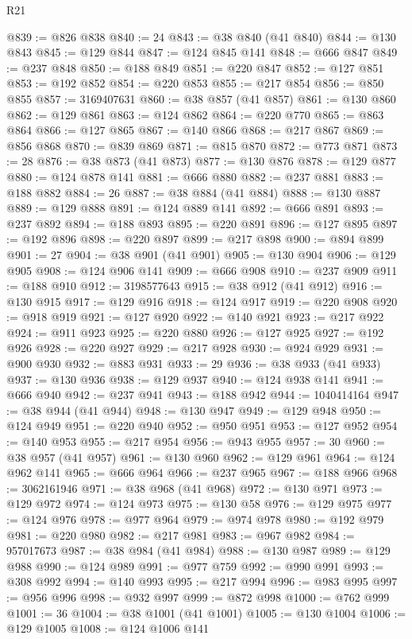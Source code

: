 \begin{lexlean}{R21}
\begin{coremodule}
@839 := @826 @838
@840 := 24
@843 := @38 @840 (@41 @840)
@844 := @130 @843
@845 := @129 @844
@847 := @124 @845 @141
@848 := @666 @847
@849 := @237 @848
@850 := @188 @849
@851 := @220 @847
@852 := @127 @851
@853 := @192 @852
@854 := @220 @853
@855 := @217 @854
@856 := @850 @855
@857 := 3169407631
@860 := @38 @857 (@41 @857)
@861 := @130 @860
@862 := @129 @861
@863 := @124 @862
@864 := @220 @770
@865 := @863 @864
@866 := @127 @865
@867 := @140 @866
@868 := @217 @867
@869 := @856 @868
@870 := @839 @869
@871 := @815 @870
@872 := @773 @871
@873 := 28
@876 := @38 @873 (@41 @873)
@877 := @130 @876
@878 := @129 @877
@880 := @124 @878 @141
@881 := @666 @880
@882 := @237 @881
@883 := @188 @882
@884 := 26
@887 := @38 @884 (@41 @884)
@888 := @130 @887
@889 := @129 @888
@891 := @124 @889 @141
@892 := @666 @891
@893 := @237 @892
@894 := @188 @893
@895 := @220 @891
@896 := @127 @895
@897 := @192 @896
@898 := @220 @897
@899 := @217 @898
@900 := @894 @899
@901 := 27
@904 := @38 @901 (@41 @901)
@905 := @130 @904
@906 := @129 @905
@908 := @124 @906 @141
@909 := @666 @908
@910 := @237 @909
@911 := @188 @910
@912 := 3198577643
@915 := @38 @912 (@41 @912)
@916 := @130 @915
@917 := @129 @916
@918 := @124 @917
@919 := @220 @908
@920 := @918 @919
@921 := @127 @920
@922 := @140 @921
@923 := @217 @922
@924 := @911 @923
@925 := @220 @880
@926 := @127 @925
@927 := @192 @926
@928 := @220 @927
@929 := @217 @928
@930 := @924 @929
@931 := @900 @930
@932 := @883 @931
@933 := 29
@936 := @38 @933 (@41 @933)
@937 := @130 @936
@938 := @129 @937
@940 := @124 @938 @141
@941 := @666 @940
@942 := @237 @941
@943 := @188 @942
@944 := 1040414164
@947 := @38 @944 (@41 @944)
@948 := @130 @947
@949 := @129 @948
@950 := @124 @949
@951 := @220 @940
@952 := @950 @951
@953 := @127 @952
@954 := @140 @953
@955 := @217 @954
@956 := @943 @955
@957 := 30
@960 := @38 @957 (@41 @957)
@961 := @130 @960
@962 := @129 @961
@964 := @124 @962 @141
@965 := @666 @964
@966 := @237 @965
@967 := @188 @966
@968 := 3062161946
@971 := @38 @968 (@41 @968)
@972 := @130 @971
@973 := @129 @972
@974 := @124 @973
@975 := @130 @58
@976 := @129 @975
@977 := @124 @976
@978 := @977 @964
@979 := @974 @978
@980 := @192 @979
@981 := @220 @980
@982 := @217 @981
@983 := @967 @982
@984 := 957017673
@987 := @38 @984 (@41 @984)
@988 := @130 @987
@989 := @129 @988
@990 := @124 @989
@991 := @977 @759
@992 := @990 @991
@993 := @308 @992
@994 := @140 @993
@995 := @217 @994
@996 := @983 @995
@997 := @956 @996
@998 := @932 @997
@999 := @872 @998
@1000 := @762 @999
@1001 := 36
@1004 := @38 @1001 (@41 @1001)
@1005 := @130 @1004
@1006 := @129 @1005
@1008 := @124 @1006 @141

\end{coremodule}
\end{lexlean}
